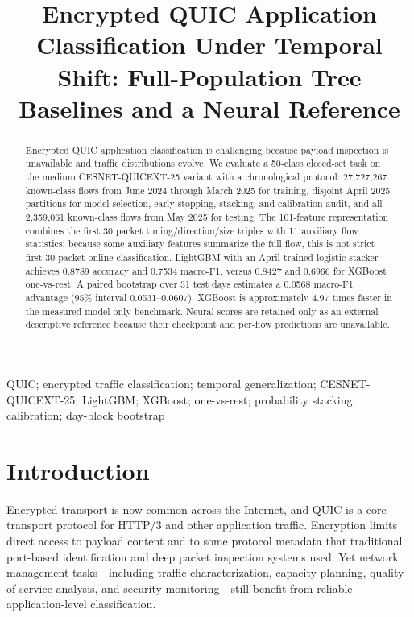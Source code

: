 \documentclass[conference]{IEEEtran}
\title{Encrypted QUIC Application Classification Under Temporal Shift: Full-Population Tree Baselines and a Neural Reference}
\author{\IEEEauthorblockN{Anonymous Submission}}
\begin{document}
\maketitle
\begin{abstract}
Encrypted QUIC application classification is challenging because payload inspection is unavailable and traffic distributions evolve. We evaluate a 50-class closed-set task on the medium CESNET-QUICEXT-25 variant with a chronological protocol: 27,727,267 known-class flows from June 2024 through March 2025 for training, disjoint April 2025 partitions for model selection, early stopping, stacking, and calibration audit, and all 2,359,061 known-class flows from May 2025 for testing. The 101-feature representation combines the first 30 packet timing/direction/size triples with 11 auxiliary flow statistics; because some auxiliary features summarize the full flow, this is not strict first-30-packet online classification. LightGBM with an April-trained logistic stacker achieves 0.8789 accuracy and 0.7534 macro-F1, versus 0.8427 and 0.6966 for XGBoost one-vs-rest. A paired bootstrap over 31 test days estimates a 0.0568 macro-F1 advantage (95\% interval 0.0531--0.0607). XGBoost is approximately 4.97 times faster in the measured model-only benchmark. Neural scores are retained only as an external descriptive reference because their checkpoint and per-flow predictions are unavailable.
\end{abstract}
\begin{IEEEkeywords}
QUIC; encrypted traffic classification; temporal generalization; CESNET-QUICEXT-25; LightGBM; XGBoost; one-vs-rest; probability stacking; calibration; day-block bootstrap
\end{IEEEkeywords}



\section{Introduction}
\label{sec:intro}

Encrypted transport is now common across the Internet, and QUIC is a core transport protocol for HTTP/3 and other application traffic. Encryption limits direct access to payload content and to some protocol metadata that traditional port-based identification and deep packet inspection systems used. Yet network management tasks---including traffic characterization, capacity planning, quality-of-service analysis, and security monitoring---still benefit from reliable application-level classification.
\end{document}
